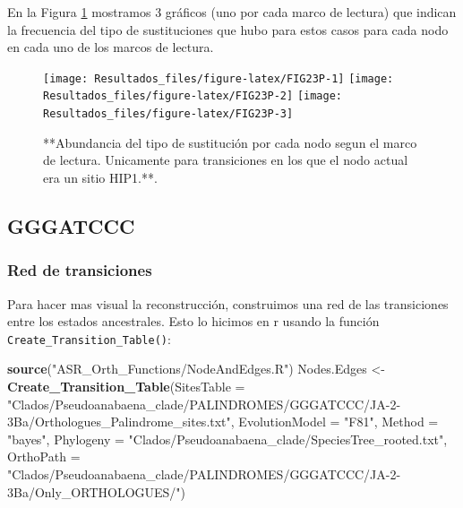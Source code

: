 \documentclass[
]{book}
\newenvironment{Shaded}{\begin{snugshade}}{\end{snugshade}}
\newcommand{\AttributeTok}[1]{\textcolor[rgb]{0.13,0.29,0.53}{#1}}
\newcommand{\FunctionTok}[1]{\textcolor[rgb]{0.13,0.29,0.53}{\textbf{#1}}}
\newcommand{\NormalTok}[1]{#1}
\newcommand{\OtherTok}[1]{\textcolor[rgb]{0.56,0.35,0.01}{#1}}
\newcommand{\StringTok}[1]{\textcolor[rgb]{0.31,0.60,0.02}{#1}}
\begin{document}
En la Figura \ref{fig:FIG23P} mostramos 3 gráficos (uno por cada marco de lectura) que indican la frecuencia del tipo de sustituciones que hubo para estos casos para cada nodo en cada uno de los marcos de lectura.

\begin{figure}

{\centering \texttt{[image: Resultados\_files/figure-latex/FIG23P-1]} \texttt{[image: Resultados\_files/figure-latex/FIG23P-2]} \texttt{[image: Resultados\_files/figure-latex/FIG23P-3]} 

}

\caption{**Abundancia del tipo de sustitución por cada nodo segun el marco de lectura. Unicamente para transiciones en los que el nodo actual era un sitio HIP1.**.}\label{fig:FIG23P}
\end{figure}

\hypertarget{gggatccc}{%
\subsection{GGGATCCC}\label{gggatccc}}

\hypertarget{red-de-transiciones-6}{%
\subsubsection{Red de transiciones}\label{red-de-transiciones-6}}

Para hacer mas visual la reconstrucción, construimos una red de las transiciones entre los estados ancestrales. Esto lo hicimos en r usando la función \texttt{Create\_Transition\_Table()}:

\begin{Shaded}
\begin{Highlighting}[]
\FunctionTok{source}\NormalTok{(}\StringTok{"ASR\_Orth\_Functions/NodeAndEdges.R"}\NormalTok{)}
\NormalTok{Nodes.Edges }\OtherTok{\textless{}{-}} \FunctionTok{Create\_Transition\_Table}\NormalTok{(}\AttributeTok{SitesTable =} \StringTok{"Clados/Pseudoanabaena\_clade/PALINDROMES/GGGATCCC/JA{-}2{-}3Ba/Orthologues\_Palindrome\_sites.txt"}\NormalTok{,}
                                \AttributeTok{EvolutionModel =} \StringTok{"F81"}\NormalTok{,}
                                \AttributeTok{Method =} \StringTok{"bayes"}\NormalTok{,}
                                \AttributeTok{Phylogeny =} \StringTok{"Clados/Pseudoanabaena\_clade/SpeciesTree\_rooted.txt"}\NormalTok{,}
                                \AttributeTok{OrthoPath =} \StringTok{"Clados/Pseudoanabaena\_clade/PALINDROMES/GGGATCCC/JA{-}2{-}3Ba/Only\_ORTHOLOGUES/"}\NormalTok{)}
\end{Highlighting}
\end{Shaded}
\end{document}
